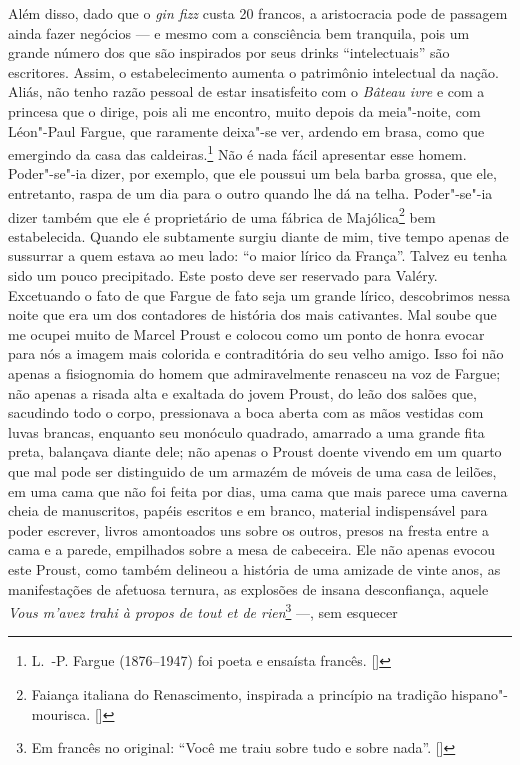 Além disso, dado que o \emph{gin fizz} custa 20 francos, a aristocracia
pode de passagem ainda fazer negócios --- e mesmo com a consciência bem
tranquila, pois um grande número dos que são inspirados por seus
drinks ``intelectuais'' são escritores. Assim, o estabelecimento aumenta o patrimônio intelectual da nação. Aliás, não tenho razão pessoal de estar insatisfeito
com o \emph{Bâteau ivre} e com a princesa que o dirige, pois ali me
encontro, muito depois da meia"-noite, com Léon"-Paul Fargue, que raramente deixa"-se ver, ardendo em brasa, como que emergindo da casa das
caldeiras.\footnote{L.~-P. Fargue (1876--1947) foi poeta e
  ensaísta francês. []} Não é nada fácil apresentar esse homem.
Poder"-se"-ia dizer, por exemplo, que ele poussui um bela barba grossa,
que ele, entretanto, raspa de um dia para o outro quando lhe dá na
telha. Poder"-se"-ia dizer também que ele é proprietário de uma fábrica de
Majólica\footnote{Faiança italiana do Renascimento, inspirada a
  princípio na tradição hispano"-mourisca. []} bem estabelecida. Quando ele
subtamente surgiu diante de mim, tive tempo apenas de sussurrar a quem
estava ao meu lado: ``o maior lírico da França''. Talvez eu tenha sido
um pouco precipitado. Este posto deve ser reservado para Valéry.
Excetuando o fato de que Fargue de fato seja um grande lírico,
descobrimos nessa noite que era um dos contadores de história dos mais
cativantes. Mal soube que me ocupei muito de Marcel Proust e colocou
como um ponto de honra evocar para nós a imagem mais colorida e
contraditória do seu velho amigo. Isso foi não apenas a fisiognomia do
homem que admiravelmente renasceu na voz de Fargue; não apenas a risada
alta e exaltada do jovem Proust, do leão dos salões que, sacudindo todo
o corpo, pressionava a boca aberta com as mãos vestidas com luvas
brancas, enquanto seu monóculo quadrado, amarrado a uma grande fita
preta, balançava diante dele; não apenas o Proust doente vivendo em um
quarto que mal pode ser distinguido de um armazém de móveis de uma casa
de leilões, em uma cama que não foi feita por dias, uma cama que mais
parece uma caverna cheia de manuscritos, papéis escritos e em branco,
material indispensável para poder escrever, livros amontoados uns sobre
os outros, presos na fresta entre a cama e a parede, empilhados sobre a
mesa de cabeceira. Ele não apenas evocou este Proust, como também
delineou a história de uma amizade de vinte anos, as manifestações de
afetuosa ternura, as explosões de insana desconfiança, aquele \emph{Vous
m'avez trahi à propos de tout et de rien}\footnote{Em francês no original: ``Você me traiu sobre tudo e sobre nada''. []} ---, sem esquecer
